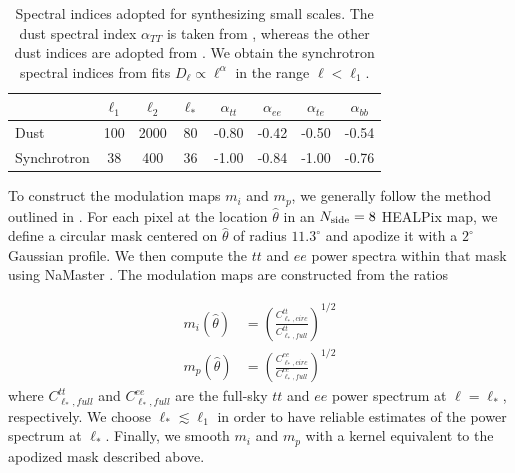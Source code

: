 \documentclass[twocolumn]{aastex631}
\begin{document}
\begin{table}
    \centering
    \footnotesize
    \begin{tabular}{lccccccc}
    \toprule 
   &   $ \ell_1  $&$\ell_2$   &$\ell_* $& $\alpha_{tt}$  & $\alpha_{ee}$ &$\alpha_{te}$ &$\alpha_{bb}$ \\
   \midrule  
   Dust & 100 & 2000 & 80 & -0.80 & -0.42& -0.50 & -0.54 \\ 
   Synchrotron & 38 & 400 & 36 & -1.00& -0.84 & -1.00 & -0.76 \\
   \bottomrule
    \end{tabular}
    \caption{Spectral indices adopted for synthesizing  small scales. The dust spectral index $\alpha_{TT}$ is taken from \citet{Miville-Deschenes:2016}, whereas the other dust indices are adopted from \citet{planck2016-l11A}. We obtain the synchrotron spectral indices  from fits $D_{\ell} \propto \ell^{\alpha}$ in the range $\ell<\ell_1$.}
    \label{tab:smallscale_par}
\end{table}

To construct the modulation maps $m_i$ and $m_p$, we generally follow the method outlined in \citet{Thorne:2017}. For each pixel at the location $\hat{\theta}$ in an $N_{\rm side} = 8$ HEALPix map, we define a circular mask centered on $\hat{\theta}$ of radius $11.3^\circ$  and apodize it with a $2^\circ$ Gaussian profile. We then compute the $tt$ and $ee$ power spectra within that mask using NaMaster \citep{Alonso:2019}. The modulation maps are constructed from the ratios 

\begin{align}
\label{eq:mod_maps}
    m_i\left(\hat{\theta} \right) &= \left(\frac{C^{tt}_{\ell_*,circ}}{C^{tt}_{\ell_*,full}}\right)^{1/2} \\
    m_p\left(\hat{\theta}\right) &= \left(\frac{C^{ee}_{\ell_*,circ}}{C^{ee}_{\ell_*,full}}\right)^{1/2}
\end{align}
where $C^{tt}_{\ell_*,full}$ and $C^{ee}_{\ell_*,full}$ are the full-sky $tt$ and $ee$ power spectrum at $\ell = \ell_*$, respectively. We choose $\ell_* \lesssim \ell_1$ in order to have reliable estimates of the power spectrum at $\ell_*$. Finally, we smooth $m_i$ and $m_p$ with a kernel equivalent to the apodized mask described above. 
 
\end{document}
